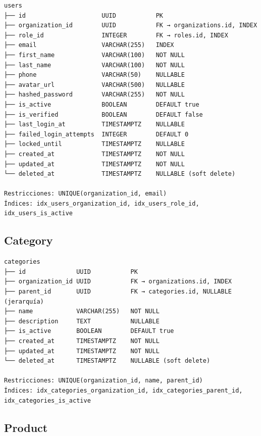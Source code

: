 \begin{verbatim}
users
├── id                     UUID           PK
├── organization_id        UUID           FK → organizations.id, INDEX
├── role_id                INTEGER        FK → roles.id, INDEX
├── email                  VARCHAR(255)   INDEX
├── first_name             VARCHAR(100)   NOT NULL
├── last_name              VARCHAR(100)   NOT NULL
├── phone                  VARCHAR(50)    NULLABLE
├── avatar_url             VARCHAR(500)   NULLABLE
├── hashed_password        VARCHAR(255)   NOT NULL
├── is_active              BOOLEAN        DEFAULT true
├── is_verified            BOOLEAN        DEFAULT false
├── last_login_at          TIMESTAMPTZ    NULLABLE
├── failed_login_attempts  INTEGER        DEFAULT 0
├── locked_until           TIMESTAMPTZ    NULLABLE
├── created_at             TIMESTAMPTZ    NOT NULL
├── updated_at             TIMESTAMPTZ    NOT NULL
└── deleted_at             TIMESTAMPTZ    NULLABLE (soft delete)

Restricciones: UNIQUE(organization_id, email)
Índices: idx_users_organization_id, idx_users_role_id, idx_users_is_active
\end{verbatim}

\subsection{Category}\label{category}

\begin{verbatim}
categories
├── id              UUID           PK
├── organization_id UUID           FK → organizations.id, INDEX
├── parent_id       UUID           FK → categories.id, NULLABLE (jerarquía)
├── name            VARCHAR(255)   NOT NULL
├── description     TEXT           NULLABLE
├── is_active       BOOLEAN        DEFAULT true
├── created_at      TIMESTAMPTZ    NOT NULL
├── updated_at      TIMESTAMPTZ    NOT NULL
└── deleted_at      TIMESTAMPTZ    NULLABLE (soft delete)

Restricciones: UNIQUE(organization_id, name, parent_id)
Índices: idx_categories_organization_id, idx_categories_parent_id, idx_categories_is_active
\end{verbatim}

\subsection{Product}\label{product}

